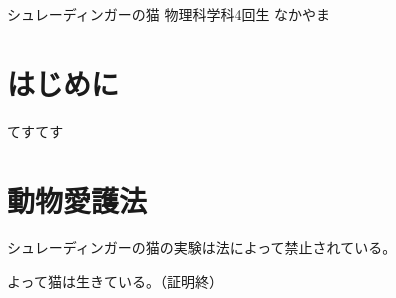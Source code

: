\documentclass[10pt,b5paper,papersize,dvipdfmx]{jsbook}
\begin{document}
\kaishititle%
  {シュレーディンガーの猫}%
  {物理科学科4回生}%
  {なかやま}%


%
\section*{はじめに}
てすてす

\section{動物愛護法}
シュレーディンガーの猫の実験は法によって禁止されている。\par
よって猫は生きている。（証明終）
\end{document}
